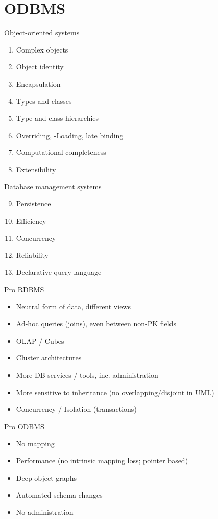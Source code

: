 
\section{ODBMS}

\begin{breakbox}
\newline Object-oriented systems
\begin{enumerate}
	\item Complex objects
	\item Object identity
	\item Encapsulation
	\item Types and classes
	\item Type and class hierarchies
	\item Overriding, -Loading, late binding
	\item Computational completeness
	\item Extensibility
\end{enumerate}
Database management systems
\begin{enumerate}
	\setcounter{enumi}{8}
	\item Persistence
	\item Efficiency
	\item Concurrency
	\item Reliability
	\item Declarative query language
\end{enumerate}
\end{breakbox}

\begin{breakbox}
\newline Pro RDBMS
\begin{itemize}
	\item Neutral form of data, different views
	\item Ad-hoc queries (joins), even between non-PK fields
	\item OLAP / Cubes
	\item Cluster architectures
	\item More DB services / tools, inc. administration
	\item More sensitive to inheritance (no overlapping/disjoint in UML)
	\item Concurrency / Isolation (transactions)
\end{itemize}
Pro ODBMS
\begin{itemize}
	\item No mapping
	\item Performance (no intrinsic mapping loss; pointer based)
	\item Deep object graphs
	\item Automated schema changes
	\item No administration
\end{itemize}
\end{breakbox}

